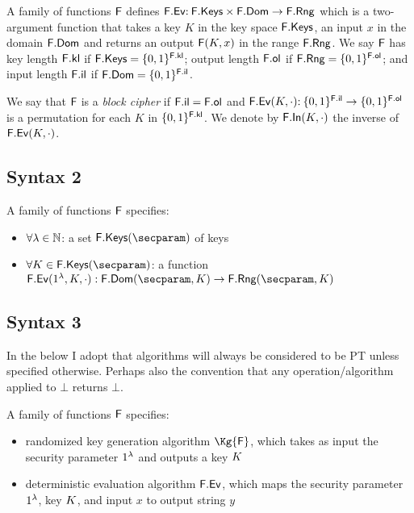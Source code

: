 
A family of functions $\mathsf{F}$ defines $\mathsf{F}.\mathsf{Ev} {:\:} \mathsf{F}.\mathsf{Keys} \times \mathsf{F}.\mathsf{Dom}\to \mathsf{F}.\mathsf{Rng}$ which is a two-argument function that takes a key $K$ in the key space $\mathsf{F}.\mathsf{Keys}$, an input $x$ in the domain $\mathsf{F}.\mathsf{Dom}$ and returns an output $\mathsf{F}(K,x)$ in the range $\mathsf{F}.\mathsf{Rng}$. We say $\mathsf{F}$ has key length $\mathsf{F}.\mathsf{kl}$ if
$\mathsf{F}.\mathsf{Keys}=\{0,1\}^{\mathsf{F}.\mathsf{kl}}$; output length $\mathsf{F}.\mathsf{ol}$ if $\mathsf{F}.\mathsf{Rng}=\{0,1\}^{\mathsf{F}.\mathsf{ol}}$; and input length $\mathsf{F}.\mathsf{il}$ if $\mathsf{F}.\mathsf{Dom}=\{0,1\}^{\mathsf{F}.\mathsf{il}}$.

We say that $\mathsf{F}$ is a \emph{block cipher} if $\mathsf{F}.\mathsf{il}=\mathsf{F}.\mathsf{ol}$ and $\mathsf{F}.\mathsf{Ev}(K,\cdot) {:\:} \{0,1\}^{\mathsf{F}.\mathsf{il}}\to\{0,1\}^{\mathsf{F}.\mathsf{ol}}$ is a permutation for each $K$ in $\{0,1\}^{\mathsf{F}.\mathsf{kl}}$. We denote by $\mathsf{F}.\mathsf{In}(K,\cdot)$ the inverse of $\mathsf{F}.\mathsf{Ev}(K,\cdot)$.

\subsection{Syntax 2}

\begin{defn}
	A family of functions $\mathsf{F}$ specifies:
	\begin{itemize}
		\item $\forall \lambda\in{{\mathbb N}}$: a set $\Keys{\FF}(\secparam)$ of keys
		\item $\forall \key\in\Keys{\FF}(\secparam)$: a function $\Ev{\FF}(\secIn,\key,\cdot):\Dom{\FF}(\secparam,\key)\to\Rng{\FF}(\secparam,\key)$
	\end{itemize}
\end{defn}

\subsection{Syntax 3}

In the below I adopt that algorithms will always be considered to be PT unless specified otherwise.
Perhaps also the convention that any operation/algorithm applied to $\bot$ returns $\bot$.

\begin{defn}
	A family of functions $\mathsf{F}$ specifies:
	\begin{itemize}
		\item randomized key generation algorithm $\Kg{\FF}$, which takes as input the security parameter $1^\lambda$ and outputs a key $K$
		\item deterministic evaluation algorithm $\mathsf{F}.\mathsf{Ev}$,  which maps the security parameter $1^\lambda$,  key $K$, and input $x$ to output string $y$ 
	\end{itemize}
\end{defn}


